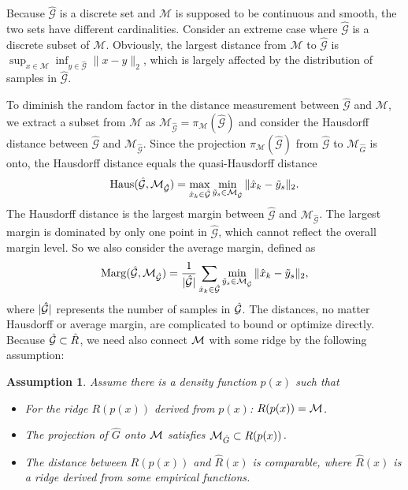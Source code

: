 \documentclass[aos,preprint]{imsart}
\newcommand{\Yao}[1]{{\textcolor{red}{[Yao: #1]}}}%
\newtheorem{assumption}[theorem]{Assumption}
\theoremstyle{remark}
\begin{document}
Because $\hat{\mathcal G}$ is a discrete set and $\mathcal M$ is supposed to be continuous and smooth, the two sets have different cardinalities. Consider an extreme case where $\hat{\mathcal G}$ is a discrete subset of $\mathcal M$. Obviously, the largest distance from $\mathcal M$ to $\hat{\mathcal G}$ is $\sup_{x\in \mathcal M}\inf_{y\in\hat{\mathcal G}} \|x-y\|_2$, which is largely affected by the distribution of samples in $\hat{\mathcal G}$.

To diminish the random factor in the distance measurement between $\hat{\mathcal G}$ and $\mathcal M$, we extract a subset from $\mathcal M$ as ${\mathcal M}_{\hat{\mathcal G}}=\pi_{\mathcal M}(\hat{\mathcal G})$ and consider the Hausdorff distance between ${\hat{\mathcal G}}$ and ${\mathcal M}_{\hat{\mathcal G}}$. Since the projection $\pi_{\mathcal M}(\hat{\mathcal G})$ from $\hat{\mathcal G}$ to $\mathcal M_{\hat{G}}$ is onto, the Hausdorff distance equals the quasi-Hausdorff distance
\begin{equation}\label{Hausd}
{\rm Haus}({\hat{\mathcal G}}, {\mathcal M}_{\hat{\mathcal G}}) = \max_{\hat{x}_k\in \hat{\mathcal G}} \min_{\tilde{y}_s\in {\mathcal M}_{\hat{\mathcal G}}}\|\hat{x}_k-\tilde{y}_s\|_2.
\end{equation}
The Hausdorff distance is the largest margin between $\hat{\mathcal G}$ and ${\mathcal M}_{\hat{\mathcal G}}$. The largest margin is dominated by only one point in $\hat{\mathcal G}$, which cannot reflect the overall margin level. So we also consider the average margin, defined as
\begin{equation}\label{margin}
{\rm Marg}({\hat{\mathcal G}, {\mathcal M}_{\hat{\mathcal G}}}) = \frac{1}{|\hat{\mathcal G}|} \sum_{\hat{x}_k\in \hat{\mathcal G}} \min_{\tilde{y}_s\in {\mathcal M}_{\hat{\mathcal G}}}\|\hat{x}_k-\tilde{y}_s\|_2,
\end{equation}
where $|\cal \hat{G}|$ represents the number of samples in $\cal \hat{G}$.
The distances, no matter Hausdorff or average margin, are complicated to bound or optimize directly. Because $\hat{\cal G}\subset \hat{R}$,  we need also connect $\cal M$ with some ridge by the following assumption:
\begin{assumption}\label{Data_assumption}
Assume there is a density function $p(x)$ such that 
\begin{itemize}
\item[1.] For the ridge $R(p(x))$ derived from $p(x)$: $R(p(x))={\cal M}$.
\item[2.] The projection of $\hat{G}$ onto ${\cal M}$ satisfies ${\cal M}_{\hat{G}}\subset R(p(x))$.
\item[3.] The distance between $R(p(x))$ and $\hat{R}(x)$ is comparable, where $\hat{R}(x)$ is a ridge derived from some empirical functions.
\end{itemize}
\end{assumption}
\end{document}
